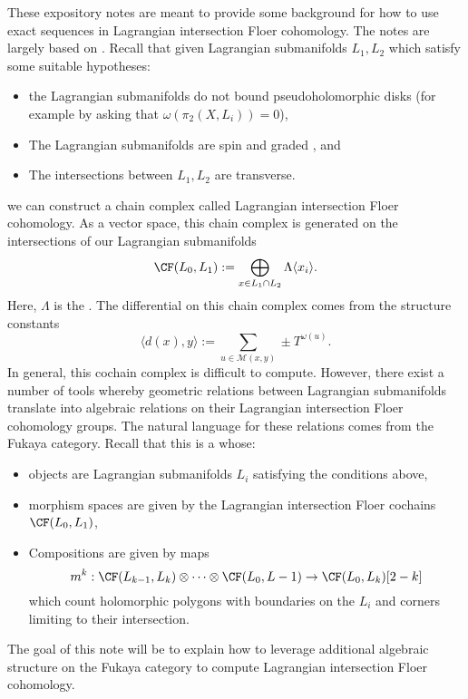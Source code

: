 
\begin{exposition}
These expository notes are meant to provide some background for how to use exact sequences in Lagrangian intersection Floer cohomology. The notes are largely based on \cite{auroux2014beginner}.
Recall that given Lagrangian submanifolds $L_1, L_2$ which satisfy some suitable hypotheses:
\begin{itemize}
    \item the Lagrangian submanifolds do not bound pseudoholomorphic disks (for example by asking that $\omega(\pi_2(X, L_i))=0$), \label{cond:unobstructed} 
    \item The Lagrangian submanifolds are spin and graded , and\label{cond:orientationgrading}
    \item The intersections between $L_1, L_2$ are transverse. \label{cond:transverseintersection}
\end{itemize}
we can construct a chain complex called Lagrangian intersection Floer cohomology. As a vector space, this chain complex is generated on the intersections of our Lagrangian submanifolds
\[\CF(L_0, L_1):= \bigoplus_{x\in L_1\cap L_2} \Lambda\langle x_i\rangle.\]
Here, $\Lambda$ is the .
The differential on this chain complex comes from the structure constants 
\[\langle d(x), y\rangle:=\sum_{u\in \mathcal M(x, y)}\pm T^{\omega (u)}.\]
In general, this cochain complex is difficult to compute. However, there exist a number of tools whereby geometric relations between Lagrangian submanifolds translate into algebraic relations on their Lagrangian intersection Floer cohomology groups. The natural language for these relations comes from the Fukaya category. Recall that this is a  whose: 
\begin{itemize}
    \item objects are Lagrangian submanifolds $L_i$ satisfying the conditions above,
    \item morphism spaces are given by the Lagrangian intersection Floer cochains $\CF(L_0, L_1)$,
    \item Compositions are given by maps 
    \[m^k: \CF(L_{k-1}, L_k)\otimes\cdots \otimes \CF(L_0, L-1)\to \CF(L_0, L_k)[2-k]\]
    which count holomorphic polygons with boundaries on the $L_i$ and corners limiting to their intersection. 
\end{itemize}
The goal of this note will be to explain how to leverage additional algebraic structure on the Fukaya category to compute Lagrangian intersection Floer cohomology.


\end{exposition}
